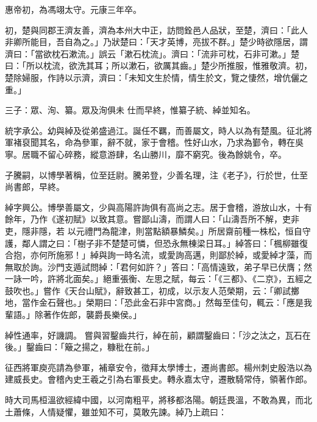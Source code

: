 \begin{pinyinscope}
 惠帝初，為馮翊太守。元康三年卒。



 初，楚與同郡王濟友善，濟為本州大中正，訪問銓邑人品狀，至楚，濟曰：「此人非卿所能目，吾自為之。」乃狀楚曰：「天才英博，亮拔不群。」楚少時欲隱居，謂濟曰：「當欲枕石漱流。」誤云「漱石枕流」。濟曰：「流非可枕，石非可漱。」楚曰：「所以枕流，欲洗其耳；所以漱石，欲厲其齒。」楚少所推服，惟雅敬濟。初，楚除婦服，作詩以示濟，濟曰：「未知文生於情，情生於文，覽之悽然，增伉儷之重。」



 三子：眾、洵、纂。眾及洵俱未
 仕而早終，惟纂子統、綽並知名。



 統字承公。幼與綽及從弟盛過江。誕任不羈，而善屬文，時人以為有楚風。征北將軍褚裒聞其名，命為參軍，辭不就，家于會稽。性好山水，乃求為鄞令，轉在吳寧。居職不留心碎務，縱意游肆，名山勝川，靡不窮究。後為餘姚令，卒。



 子騰嗣，以博學著稱，位至廷尉。騰弟登，少善名理，注《老子》，行於世，仕至尚書郎，早終。



 綽字興公。博學善屬文，少與高陽許詢俱有高尚之志。居于會稽，游放山水，十有餘年，乃作《遂初賦》以致其意。嘗鄙山濤，而謂人曰：「山濤吾所不解，吏非吏，隱非隱，若
 以元禮門為龍津，則當點額暴鱗矣。」所居齋前種一株松，恒自守護，鄰人謂之曰：「樹子非不楚楚可憐，但恐永無棟梁日耳。」綽答曰：「楓柳雖復合抱，亦何所施邪！」綽與詢一時名流，或愛詢高邁，則鄙於綽，或愛綽才藻，而無取於詢。沙門支遁試問綽：「君何如許？」答曰：「高情遠致，弟子早已伏膺；然一詠一吟，許將北面矣。」絕重張衡、左思之賦，每云：「《三都》、《二京》，五經之鼓吹也。」嘗作《天台山賦》，辭致甚工，初成，以示友人范榮期，云：「卿試擲地，當作金石聲也。」榮期曰：「恐此金石非中宮商。」然每至佳句，輒云：「應是我輩語。」除著作佐郎，襲爵長樂侯。」



 綽性通率，好譏調。
 嘗與習鑿齒共行，綽在前，顧謂鑿齒曰：「沙之汰之，瓦石在後。」鑿齒曰：「簸之揚之，糠秕在前。」



 征西將軍庾亮請為參軍，補章安令，徵拜太學博士，遷尚書郎。楊州刺史殷浩以為建威長史。會稽內史王羲之引為右軍長史。轉永嘉太守，遷散騎常侍，領著作郎。



 時大司馬桓溫欲經緯中國，以河南粗平，將移都洛陽。朝廷畏溫，不敢為異，而北土蕭條，人情疑懼，雖並知不可，莫敢先諫。綽乃上疏曰：




\end{pinyinscope}
